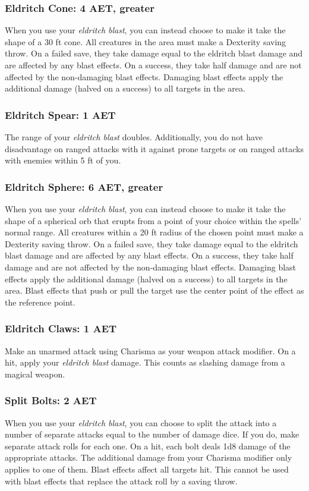 \subsubsection{Eldritch Cone: 4 AET, greater}
When you use your \textit{eldritch blast}, you can instead choose to make it take the shape of a 30 ft cone. All creatures in the area must make a Dexterity saving throw. On a failed save, they take damage equal to the eldritch blast damage and are affected by any blast effects. On a success, they take half damage and are not affected by the non-damaging blast effects. Damaging blast effects apply the additional damage (halved on a success) to all targets in the area.

\subsubsection{Eldritch Spear: 1 AET}
The range of your \textit{eldritch blast} doubles. Additionally, you do not have disadvantage on ranged attacks with it against prone targets or on ranged attacks with enemies within 5 ft of you.

\subsubsection{Eldritch Sphere: 6 AET, greater}
When you use your \textit{eldritch blast}, you can instead choose to make it take the shape of a spherical orb that erupts from a point of your choice within the spells' normal range. All creatures within a 20 ft radius of the chosen point must make a Dexterity saving throw. On a failed save, they take damage equal to the eldritch blast damage and are affected by any blast effects. On a success, they take half damage and are not affected by the non-damaging blast effects. Damaging blast effects apply the additional damage (halved on a success) to all targets in the area. Blast effects that push or pull the target use the center point of the effect as the reference point.

\subsubsection{Eldritch Claws: 1 AET}
Make an unarmed attack using Charisma as your weapon attack modifier. On a hit, apply your \textit{eldritch blast} damage. This counts as slashing damage from a magical weapon.

\subsubsection{Split Bolts: 2 AET}
When you use your \textit{eldritch blast}, you can choose to split the attack into a number of separate attacks equal to the number of damage dice. If you do, make separate attack rolls for each one. On a hit, each bolt deals 1d8 damage of the appropriate attacks. The additional damage from your Charisma modifier only applies to one of them. Blast effects affect all targets hit. This cannot be used with blast effects that replace the attack roll by a saving throw.

